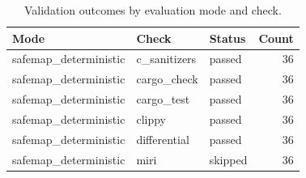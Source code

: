 \begin{table}[t]
\centering
\caption{Validation outcomes by evaluation mode and check.}
\label{tab:safemap-validation-statuses}
\begin{tabular}{lllr}
\hline
Mode & Check & Status & Count \\
\hline
safemap\_deterministic & c\_sanitizers & passed & 36 \\
safemap\_deterministic & cargo\_check & passed & 36 \\
safemap\_deterministic & cargo\_test & passed & 36 \\
safemap\_deterministic & clippy & passed & 36 \\
safemap\_deterministic & differential & passed & 36 \\
safemap\_deterministic & miri & skipped & 36 \\
\hline
\end{tabular}
\end{table}
